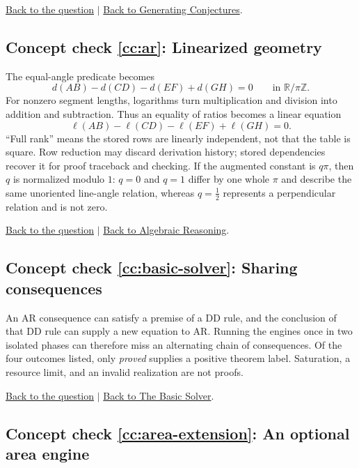 \documentclass[reqno]{amsart}
\DeclareMathOperator{\1}{\textbf{1}}
\begin{document}
\noindent\hyperlink{ccq:conjectures}{Back to the question}
$\mid$
\hyperref[sec: Generating Conjectures]{Back to Generating Conjectures}.

\hypertarget{cca:ar}{}
\subsection*{Concept check \ref{cc:ar}: Linearized geometry}

The equal-angle predicate becomes
\[
d(AB)-d(CD)-d(EF)+d(GH)=0
\qquad\text{in }\mathbb R/\pi\mathbb Z.
\]
For nonzero segment lengths, logarithms turn multiplication and division into
addition and subtraction. Thus an equality of ratios becomes a linear
equation
\[
\ell(AB)-\ell(CD)-\ell(EF)+\ell(GH)=0.
\]
``Full rank'' means the stored rows are linearly independent, not that the
table is square. Row reduction may discard derivation history; stored
dependencies recover it for proof traceback and checking. If the augmented
constant is $q\pi$, then $q$ is normalized modulo $1$: $q=0$ and $q=1$
differ by one whole $\pi$ and describe the same unoriented line-angle relation,
whereas $q=\tfrac12$ represents a perpendicular relation and is not zero.

\noindent\hyperlink{ccq:ar}{Back to the question}
$\mid$
\hyperref[sec: Algebraic Reasoning]{Back to Algebraic Reasoning}.

\hypertarget{cca:basic-solver}{}
\subsection*{Concept check \ref{cc:basic-solver}: Sharing consequences}

An AR consequence can satisfy a premise of a DD rule, and the conclusion of
that DD rule can supply a new equation to AR. Running the engines once in two
isolated phases can therefore miss an alternating chain of consequences. Of
the four outcomes listed, only \emph{proved} supplies a positive theorem label.
Saturation, a resource limit, and an invalid realization are not proofs.

\noindent\hyperlink{ccq:basic-solver}{Back to the question}
$\mid$
\hyperref[sec: Basic Solver]{Back to The Basic Solver}.

\hypertarget{cca:area-extension}{}
\subsection*{Concept check \ref{cc:area-extension}: An optional area engine}
\end{document}
